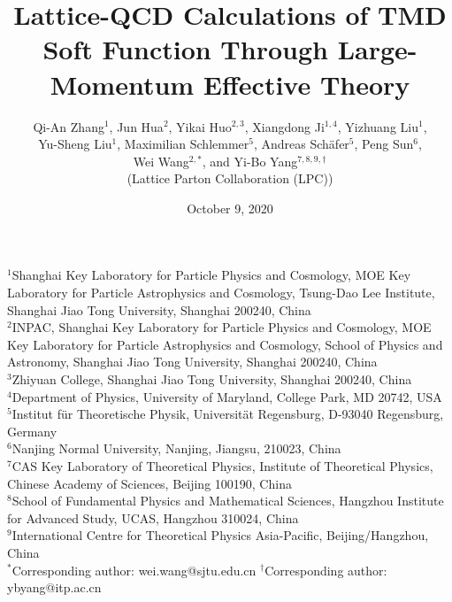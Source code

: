 \documentclass[11pt]{article}
\begin{document}
\title{\bfseries Lattice-QCD Calculations of TMD Soft Function Through Large-Momentum Effective Theory}

\author{Qi-An Zhang$^{1}$, Jun Hua$^{2}$, Yikai Huo$^{2,3}$, Xiangdong Ji$^{1,4}$, Yizhuang Liu$^{1}$,\\
Yu-Sheng Liu$^{1}$, Maximilian Schlemmer$^{5}$, Andreas Sch\"afer$^{5}$, Peng Sun$^{6}$,\\
Wei Wang$^{2,\ast}$, and Yi-Bo Yang$^{7,8,9,\dagger}$\\[6pt]
{\small (Lattice Parton Collaboration (LPC))}}
\date{October 9, 2020}

\maketitle

\begin{flushleft}
\begin{minipage}{0.92\textwidth}
{\small
$^{1}$Shanghai Key Laboratory for Particle Physics and Cosmology, MOE Key Laboratory for Particle Astrophysics and Cosmology, Tsung-Dao Lee Institute, Shanghai Jiao Tong University, Shanghai 200240, China\\
$^{2}$INPAC, Shanghai Key Laboratory for Particle Physics and Cosmology, MOE Key Laboratory for Particle Astrophysics and Cosmology, School of Physics and Astronomy, Shanghai Jiao Tong University, Shanghai 200240, China\\
$^{3}$Zhiyuan College, Shanghai Jiao Tong University, Shanghai 200240, China\\
$^{4}$Department of Physics, University of Maryland, College Park, MD 20742, USA\\
$^{5}$Institut f\"ur Theoretische Physik, Universit\"at Regensburg, D-93040 Regensburg, Germany\\
$^{6}$Nanjing Normal University, Nanjing, Jiangsu, 210023, China\\
$^{7}$CAS Key Laboratory of Theoretical Physics, Institute of Theoretical Physics, Chinese Academy of Sciences, Beijing 100190, China\\
$^{8}$School of Fundamental Physics and Mathematical Sciences, Hangzhou Institute for Advanced Study, UCAS, Hangzhou 310024, China\\
$^{9}$International Centre for Theoretical Physics Asia-Pacific, Beijing/Hangzhou, China\\
$^{\ast}$Corresponding author: wei.wang@sjtu.edu.cn \quad
$^{\dagger}$Corresponding author: ybyang@itp.ac.cn
}
\end{minipage}
\end{flushleft}
\end{document}
